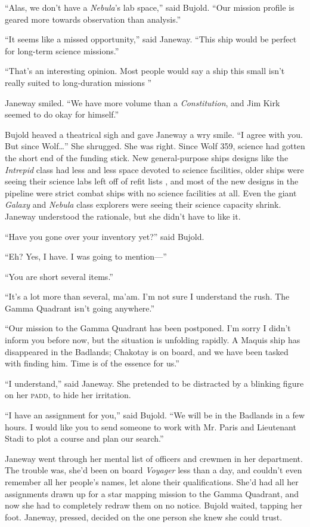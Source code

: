 \documentclass[twoside,letterpaper,12pt]{memoir}
\begin{document}
``Alas, we don’t have a \textit{Nebula}’s lab space,'' said Bujold. ``Our mission profile is geared more towards observation than analysis.''

``It seems like a missed opportunity,'' said Janeway. ``This ship would be perfect for long-term science missions.''

``That’s an interesting opinion. Most people would say a ship this small isn't really suited to long-duration missions ''

Janeway smiled. ``We have more volume than a \textit{Constitution}, and Jim Kirk seemed to do okay for himself.''

Bujold heaved a theatrical sigh and gave Janeway a wry smile. ``I agree with you. But since Wolf\ldots '' She shrugged. She was right. Since Wolf 359, science had gotten the short end of the funding stick. New general-purpose ships designs like the \textit{Intrepid }class had less and less space devoted to science facilities, older ships were seeing their science labs left off of refit lists , and most of the new designs in the pipeline were strict combat ships with no science facilities at all. Even the giant \textit{Galaxy} and \textit{Nebula} class explorers were seeing their science capacity shrink. Janeway understood the rationale, but she didn't have to like it.

``Have you gone over your inventory yet?'' said Bujold.

``Eh? Yes, I have. I was going to mention---''

``You are short several items.''

``It's a lot more than several, ma'am. I'm not sure I understand the rush. The Gamma Quadrant isn't going anywhere.''

``Our mission to the Gamma Quadrant has been postponed. I'm sorry I didn't inform you before now, but the situation is unfolding rapidly. A Maquis ship has disappeared in the Badlands; Chakotay is on board, and we have been tasked with finding him. Time is of the essence for us.''

``I understand,'' said Janeway. She pretended to be distracted by a blinking figure on her \textsc{padd}, to hide her irritation.

``I have an assignment for you,'' said Bujold. ``We will be in the Badlands in a few hours. I would like you to send someone to work with Mr. Paris and Lieutenant Stadi to plot a course and plan our search.''

Janeway went through her mental list of officers and crewmen in her department. The trouble was, she'd been on board \textit{Voyager} less than a day, and couldn't even remember all her people's names, let alone their qualifications. She'd had all her assignments drawn up for a star mapping mission to the Gamma Quadrant, and now she had to completely redraw them on no notice. Bujold waited, tapping her foot. Janeway, pressed, decided on the one person she knew she could trust.
\end{document}

